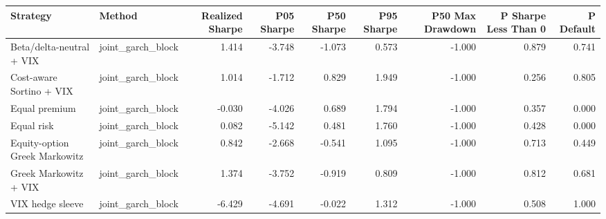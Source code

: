 \begin{tabular}{llrrrrrrr}
\toprule
Strategy & Method & Realized Sharpe & P05 Sharpe & P50 Sharpe & P95 Sharpe & P50 Max Drawdown & P Sharpe Less Than 0 & P Default \\
\midrule
Beta/delta-neutral + VIX & joint\_garch\_block & 1.414 & -3.748 & -1.073 & 0.573 & -1.000 & 0.879 & 0.741 \\
Cost-aware Sortino + VIX & joint\_garch\_block & 1.014 & -1.712 & 0.829 & 1.949 & -1.000 & 0.256 & 0.805 \\
Equal premium & joint\_garch\_block & -0.030 & -4.026 & 0.689 & 1.794 & -1.000 & 0.357 & 0.000 \\
Equal risk & joint\_garch\_block & 0.082 & -5.142 & 0.481 & 1.760 & -1.000 & 0.428 & 0.000 \\
Equity-option Greek Markowitz & joint\_garch\_block & 0.842 & -2.668 & -0.541 & 1.095 & -1.000 & 0.713 & 0.449 \\
Greek Markowitz + VIX & joint\_garch\_block & 1.374 & -3.752 & -0.919 & 0.809 & -1.000 & 0.812 & 0.681 \\
VIX hedge sleeve & joint\_garch\_block & -6.429 & -4.691 & -0.022 & 1.312 & -1.000 & 0.508 & 1.000 \\
\bottomrule
\end{tabular}
